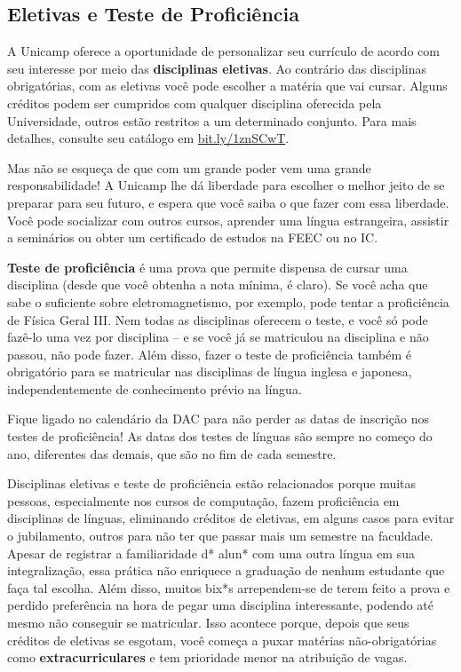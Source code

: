 \subsection{Eletivas e Teste de Proficiência}

A Unicamp oferece a oportunidade de personalizar seu currículo de acordo com
seu interesse por meio das \textbf{disciplinas eletivas}. Ao contrário das
disciplinas obrigatórias, com as eletivas você pode escolher a matéria que vai
cursar. Alguns créditos podem ser cumpridos com qualquer disciplina oferecida
pela Universidade, outros estão restritos a um determinado conjunto. Para mais
detalhes, consulte seu catálogo em \url{bit.ly/1znSCwT}.

Mas não se esqueça de que com um grande poder vem uma grande responsabilidade!
A Unicamp lhe dá liberdade para escolher o melhor jeito de se preparar para seu
futuro, e espera que você saiba o que fazer com essa liberdade. Você pode
socializar com outros cursos, aprender uma língua estrangeira, assistir a
seminários ou obter um certificado de estudos na FEEC ou no IC.

\textbf{Teste de proficiência} é uma prova que permite dispensa de cursar uma
disciplina (desde que você obtenha a nota mínima, é claro). Se você acha que
sabe o suficiente sobre eletromagnetismo, por exemplo, pode tentar a
proficiência de Física Geral III.  Nem todas as disciplinas oferecem o teste, e
você só pode fazê-lo uma vez por disciplina -- e se você já se matriculou na
disciplina e não passou, não pode fazer.  Além disso, fazer o teste de
proficiência também é obrigatório para se matricular nas disciplinas de língua
inglesa e japonesa, independentemente de conhecimento prévio na língua.

Fique ligado no calendário da DAC para não perder as datas de inscrição nos
testes de proficiência! As datas dos testes de línguas são sempre no começo do
ano, diferentes das demais, que são no fim de cada semestre.

Disciplinas eletivas e teste de proficiência estão relacionados porque muitas
pessoas, especialmente nos cursos de computação, fazem proficiência em
disciplinas de línguas, eliminando créditos de eletivas, em alguns casos para
evitar o jubilamento, outros para não ter que passar mais um semestre na
faculdade. Apesar de registrar a familiaridade d* alun* com uma outra língua em
sua integralização, essa prática não enriquece a graduação de nenhum estudante
que faça tal escolha. Além disso, muitos bix*s arrependem-se de terem feito a
prova e perdido preferência na hora de pegar uma disciplina interessante,
podendo até mesmo não conseguir se matricular. Isso acontece porque, depois que
seus créditos de eletivas se esgotam, você começa a puxar matérias
não-obrigatórias como \textbf{extracurriculares} e tem prioridade menor na
atribuição de vagas.

